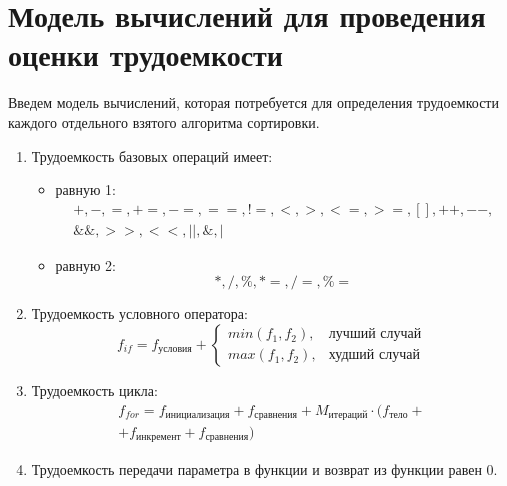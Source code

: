 \section{Модель вычислений для проведения \newline оценки трудоемкости}

Введем модель вычислений, которая потребуется для определения трудоемкости каждого отдельного взятого алгоритма сортировки.
\begin{enumerate}[label={\arabic*)}]
	\item Трудоемкость базовых операций имеет:
	\begin{itemize}[label=---]
		\item равную 1:
		\begin{equation}
			\label{for:operations_1}
			\begin{gathered}
				+, -, =, +=, -=, ==, !=, <, >, <=, >=, [], ++, {-}-,\\
				\&\&, >>, <<, ||, \&, |
			\end{gathered}
		\end{equation}
		\item равную 2:
		\begin{equation}
			\label{for:operations_2}
			*, /, \%, *=, /=, \%=
		\end{equation}
	\end{itemize}
	\item Трудоемкость условного оператора:
	\begin{equation}
		\label{for:if}
		f_{if} = f_{\text{условия}} + 
		\begin{cases}
			min(f_1, f_2), & \text{лучший случай}\\
			max(f_1, f_2), & \text{худший случай}
		\end{cases}
	\end{equation}
	\item Трудоемкость цикла:
	\begin{equation}
		\label{for:for}
		\begin{gathered}
			f_{for} = f_{\text{инициализация}} + f_{\text{сравнения}} + M_{\text{итераций}} \cdot (f_{\text{тело}} +\\+ f_{\text{инкремент}}
			+ f_{\text{сравнения}})
		\end{gathered}
	\end{equation}
	\item Трудоемкость передачи параметра в функции и возврат из функции равен 0.
\end{enumerate}


